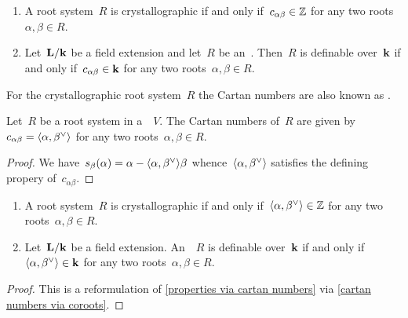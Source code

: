 \begin{lemma}
  \label{properties via cartan numbers}
  \leavevmode
  \begin{enumerate}
    \item
      \label{crystallographic via cartan numbers}
      A root system~$R$ is crystallographic if and only if~$c_{\alpha \beta} \in \mathbb{Z}$ for any two roots~$\alpha, \beta \in R$.
    \item
      Let~$\mathbf{L}/\mathbf{k}$ be a field extension and let~$R$ be an~{\rootsystem{$\Lf$}}.
      Then~$R$ is definable over~$\kf$ if and only if~$c_{\alpha \beta} \in \mathbf{k}$ for any two roots~$\alpha, \beta \in R$.
    \qedhere
  \end{enumerate}
\end{lemma}


\begin{remark}
  For the crystallographic root system~$R$ the Cartan numbers are also known as .
\end{remark}


\begin{lemma}
  \label{cartan numbers via coroots}
  Let~$R$ be a root system in a~{\vectorspace{$\kf$}}~$V$.
  The Cartan numbers of~$R$ are given by~$c_{\alpha \beta} = \pair{\alpha, \check{\beta}}$ for any two roots~$\alpha, \beta \in R$.
\end{lemma}


\begin{proof}
  We have~$s_\beta(\alpha) = \alpha - \pair{\alpha, \check{\beta}} \beta$ whence~$\pair{\alpha, \check{\beta}}$ satisfies the defining propery of~$c_{\alpha \beta}$.
\end{proof}


\begin{corollary}
  \leavevmode
  \begin{enumerate}
    \item
      A root system~$R$ is crystallographic if and only if~$\pair{\alpha, \check{\beta}} \in \Integer$ for any two roots~$\alpha, \beta \in R$.
    \item
      Let~$\mathbf{L}/\mathbf{k}$ be a field extension.
      An~{\rootsystem{$\Lf$}}~$R$ is definable over~$\kf$ if and only if~$\pair{\alpha, \check{\beta}} \in \kf$ for any two roots~$\alpha, \beta \in R$.
  \end{enumerate}
\end{corollary}


\begin{proof}
  This is a reformulation of \cref{properties via cartan numbers} via \cref{cartan numbers via coroots}.
\end{proof}


